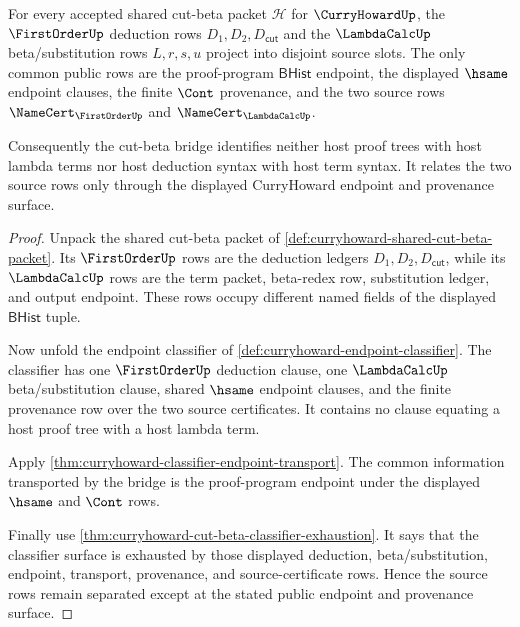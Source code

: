 \begin{theorem}\label{thm:curryhoward-cut-beta-source-row-separation}
For every accepted shared cut-beta packet $\mathcal H$ for $\CurryHowardUp$,
the $\FirstOrderUp$ deduction rows $D_1,D_2,D_{\mathsf{cut}}$ and the
$\LambdaCalcUp$ beta/substitution rows $L,r,s,u$ project into disjoint source
slots. The only common public rows are the proof-program $\mathsf{BHist}$
endpoint, the displayed $\hsame$ endpoint clauses, the finite $\Cont$
provenance, and the two source rows $\NameCert_{\FirstOrderUp}$ and
$\NameCert_{\LambdaCalcUp}$.

Consequently the cut-beta bridge identifies neither host proof trees with host
lambda terms nor host deduction syntax with host term syntax. It relates the
two source rows only through the displayed CurryHoward endpoint and provenance
surface.
\end{theorem}
\begin{proof}
Unpack the shared cut-beta packet of
\autoref{def:curryhoward-shared-cut-beta-packet}. Its $\FirstOrderUp$ rows are
the deduction ledgers $D_1,D_2,D_{\mathsf{cut}}$, while its $\LambdaCalcUp$
rows are the term packet, beta-redex row, substitution ledger, and output
endpoint. These rows occupy different named fields of the displayed
$\mathsf{BHist}$ tuple.

Now unfold the endpoint classifier of
\autoref{def:curryhoward-endpoint-classifier}. The classifier has one
$\FirstOrderUp$ deduction clause, one $\LambdaCalcUp$ beta/substitution clause,
shared $\hsame$ endpoint clauses, and the finite provenance row over the two
source certificates. It contains no clause equating a host proof tree with a
host lambda term.

Apply \autoref{thm:curryhoward-classifier-endpoint-transport}. The common
information transported by the bridge is the proof-program endpoint under the
displayed $\hsame$ and $\Cont$ rows.

Finally use \autoref{thm:curryhoward-cut-beta-classifier-exhaustion}. It says
that the classifier surface is exhausted by those displayed deduction,
beta/substitution, endpoint, transport, provenance, and source-certificate
rows. Hence the source rows remain separated except at the stated public
endpoint and provenance surface.
\end{proof}

